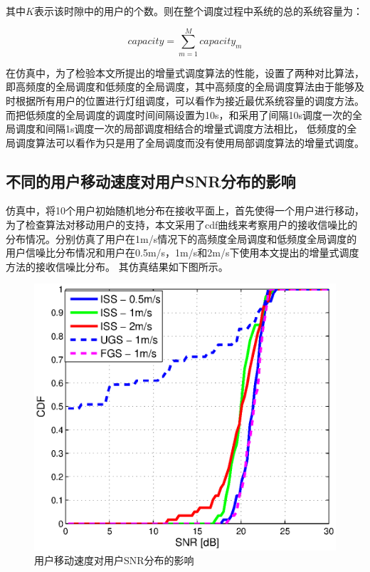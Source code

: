 其中$K$表示该时隙中的用户的个数。则在整个调度过程中系统的总的系统容量为：

\begin{equation}
    capacity = \sum\limits_{m = 1}^M {capacit{y_m}}
\end{equation}

在仿真中，为了检验本文所提出的增量式调度算法的性能，设置了两种对比算法，即高频度的全局调度和低频度的全局调度，其中高频度的全局调度算法由于能够及时根据所有用户的位置进行灯组调度，可以看作为接近最优系统容量的调度方法。而把低频度的全局调度的调度时间间隔设置为10s，和采用了间隔10s调度一次的全局调度和间隔1s调度一次的局部调度相结合的增量式调度方法相比，
低频度的全局调度算法可以看作为只是用了全局调度而没有使用局部调度算法的增量式调度。

\subsection{不同的用户移动速度对用户SNR分布的影响}
仿真中，将10个用户初始随机地分布在接收平面上，首先使得一个用户进行移动，为了检查算法对移动用户的支持，本文采用了cdf曲线来考察用户的接收信噪比的分布情况。分别仿真了用户在1m/s情况下的高频度全局调度和低频度全局调度的用户信噪比分布情况和用户在0.5m/s，1m/s和2m/s下使用本文提出的增量式调度方法的接收信噪比分布。
其仿真结果如下图所示。

\begin{figure}[htbp]
    \centering
	\includegraphics[width=\textwidth]{figures/chapter-5/Speed2Snr.eps}
	\caption{用户移动速度对用户SNR分布的影响}
	\label{fig:speed-2-snr}
\end{figure}

